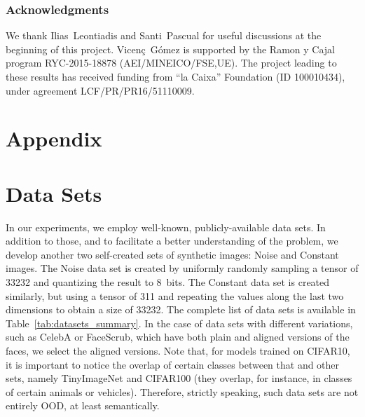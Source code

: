 \documentclass[letterpaper]{article} \usepackage{iclr2020_conference,times}
\begin{document}
\ificlrfinal

\subsubsection*{Acknowledgments}

We thank Ilias~Leontiadis and Santi~Pascual for useful discussions at the beginning of this project.  Vicen\c{c}~G\'omez is supported by the Ramon y Cajal program RYC-2015-18878 (AEI/MINEICO/FSE,UE). The project leading to these results has received funding from ``la Caixa'' Foundation (ID 100010434), under agreement LCF/PR/PR16/51110009.

\fi






\clearpage{}\clearpage
\appendix

\section*{Appendix}

\section{Data Sets}
\label{sec:data}

In our experiments, we employ well-known, publicly-available data sets. In addition to those, and to facilitate a better understanding of the problem, we develop another two self-created sets of synthetic images: Noise and Constant images. The Noise data set is created by uniformly randomly sampling a tensor of 33232 and quantizing the result to 8~bits. The Constant data set is created similarly, but using a tensor of 311 and repeating the values along the last two dimensions to obtain a size of 33232. The complete list of data sets is available in Table~\ref{tab:datasets_summary}. In the case of data sets with different variations, such as CelebA or FaceScrub, which have both plain and aligned versions of the faces, we select the aligned versions. Note that, for models trained on CIFAR10, it is important to notice the overlap of certain classes between that and other sets, namely TinyImageNet and CIFAR100 (they overlap, for instance, in classes of certain animals or vehicles). Therefore, strictly speaking, such data sets are not entirely OOD, at least semantically.
\end{document}
